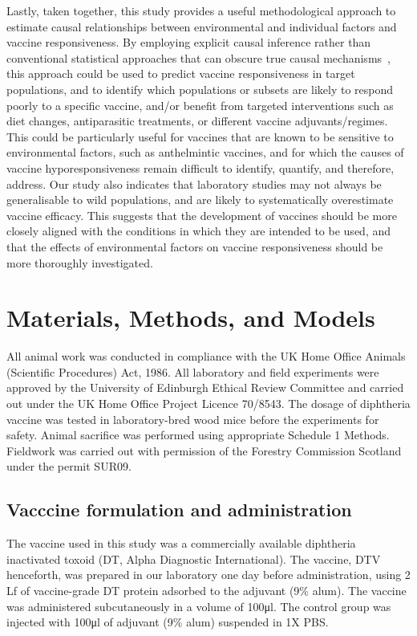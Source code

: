 \documentclass[a4paper, hidelinks, 11pt]{article}
\begin{document}
Lastly, taken together, this study provides a useful methodological approach to estimate causal relationships between environmental and individual factors and vaccine responsiveness. By employing explicit causal inference rather than conventional statistical approaches that can obscure true causal mechanisms~\cite{Franks2025}, this approach could be used to predict vaccine responsiveness in target populations, and to identify which populations or subsets are likely to respond poorly to a specific vaccine, and/or benefit from targeted interventions such as diet changes, antiparasitic treatments, or different vaccine adjuvants/regimes. This could be particularly useful for vaccines that are known to be sensitive to environmental factors, such as anthelmintic vaccines, and for which the causes of vaccine hyporesponsiveness remain difficult to identify, quantify, and therefore, address. Our study also indicates that laboratory studies may not always be generalisable to wild populations, and are likely to systematically overestimate vaccine efficacy. This suggests that the development of vaccines should be more closely aligned with the conditions in which they are intended to be used, and that the effects of environmental factors on vaccine responsiveness should be more thoroughly investigated.

\section{Materials, Methods, and Models} \label{sec:methods}

All animal work was conducted in compliance with the UK Home Office Animals (Scientific Procedures) Act, 1986. All laboratory and field experiments were approved by the University of Edinburgh Ethical Review Committee and carried out under the UK Home Office Project Licence 70/8543. The dosage of diphtheria vaccine was tested in laboratory-bred wood mice before the experiments for safety. Animal sacrifice was performed using appropriate Schedule 1 Methods. Fieldwork was carried out with permission of the Forestry Commission Scotland under the permit SUR09.

\subsection{Vacccine formulation and administration}

The vaccine used in this study was a commercially available diphtheria inactivated toxoid (DT, Alpha Diagnostic International). The vaccine, DTV henceforth, was prepared in our laboratory one day before administration, using 2 Lf of vaccine-grade DT protein adsorbed to the adjuvant (9\% alum). The vaccine was administered subcutaneously in a volume of 100μl. The control group was injected with 100μl of adjuvant (9\% alum) suspended in 1X PBS.
\end{document}
